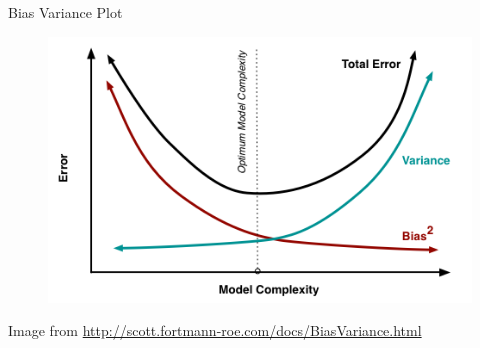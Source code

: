 \begin{frame}{Bias Variance Plot}
    \begin{figure}
        \centering
        \includegraphics[width=0.9\linewidth]{images/linear-regression/linear-regression-19.png}
    \end{figure}
    \vspace{-1em}
    \footnotesize{Image from \url{http://scott.fortmann-roe.com/docs/BiasVariance.html}}
\end{frame}
